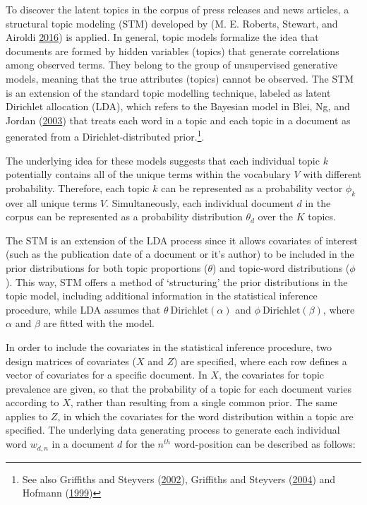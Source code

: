 \documentclass[
]{article}
\begin{document}
To discover the latent topics in the corpus of press releases and news
articles, a structural topic modeling (STM) developed by (M. E. Roberts,
Stewart, and Airoldi \protect\hyperlink{ref-roberts_model_2016}{2016})
is applied. In general, topic models formalize the idea that documents
are formed by hidden variables (topics) that generate correlations among
observed terms. They belong to the group of unsupervised generative
models, meaning that the true attributes (topics) cannot be observed.
The STM is an extension of the standard topic modelling technique,
labeled as latent Dirichlet allocation (LDA), which refers to the
Bayesian model in Blei, Ng, and Jordan
(\protect\hyperlink{ref-blei_latent_2003}{2003}) that treats each word
in a topic and each topic in a document as generated from a
Dirichlet-distributed prior.\footnote{See also Griffiths and Steyvers
  (\protect\hyperlink{ref-griffiths_probabilistic_2002}{2002}),
  Griffiths and Steyvers
  (\protect\hyperlink{ref-griffiths_finding_2004}{2004}) and Hofmann
  (\protect\hyperlink{ref-hofmann_probabilistic_1999}{1999})}.

The underlying idea for these models suggests that each individual topic
\(k\) potentially contains all of the unique terms within the vocabulary
\(V\) with different probability. Therefore, each topic \(k\) can be
represented as a probability vector \(\phi_k\) over all unique terms
\(V\). Simultaneously, each individual document \(d\) in the corpus can
be represented as a probability distribution \(\theta_d\) over the \(K\)
topics.

The STM is an extension of the LDA process since it allows covariates of
interest (such as the publication date of a document or it's author) to
be included in the prior distributions for both topic proportions
(\(\theta\)) and topic-word distributions (\(\phi\)). This way, STM
offers a method of `structuring' the prior distributions in the topic
model, including additional information in the statistical inference
procedure, while LDA assumes that \(\theta ~ \text{Dirichlet}(\alpha)\)
and \(\phi ~ \text{Dirichlet}(\beta)\), where \(\alpha\) and \(\beta\)
are fitted with the model.

In order to include the covariates in the statistical inference
procedure, two design matrices of covariates (\(X\) and \(Z\)) are
specified, where each row defines a vector of covariates for a specific
document. In \(X\), the covariates for topic prevalence are given, so
that the probability of a topic for each document varies according to
\(X\), rather than resulting from a single common prior. The same
applies to \(Z\), in which the covariates for the word distribution
within a topic are specified. The underlying data generating process to
generate each individual word \(w_{d,n}\) in a document \(d\) for the
\(n^{th}\) word-position can be described as follows:
\end{document}

